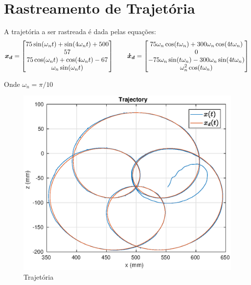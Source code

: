 \section{Rastreamento de Trajetória}
A trajetória a ser rastreada é dada pelas equações:
\begin{gather}
\bm{x_d} = \begin{bmatrix}75 \sin(\omega_n t) + \sin (4 \omega_n t) + 500 \\ 57 \\ 75 \cos(\omega_n t) + \cos(4\omega_n t) -67 \\ \omega_n \sin(\omega_nt) \end{bmatrix}
\qquad
\bm{\dot{x}_d} = \begin{bmatrix}75\omega_n \cos(t\omega_n) + 300 \omega_n \cos(4t\omega_n) \\
0 \\
-75 \omega_n \sin(t \omega_n) - 300 \omega_n \sin(4t\omega_n) \\
\omega_n^2 \cos(t \omega_n)\end{bmatrix}
\end{gather}

Onde $\omega_n = \pi/10$

\begin{figure}[!ht]
\centering
  \includegraphics[width=0.5\linewidth]{./img/trk1/trajectory.eps}
  \caption{Trajetória}
  \label{fig:sub1}
\end{figure}%



